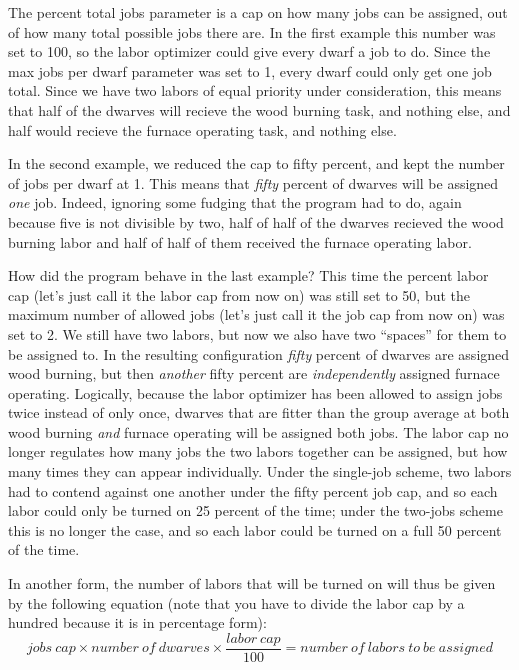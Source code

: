 \documentclass[]{article}
\begin{document}
The percent total jobs parameter is a cap on how many jobs can be assigned, out of how many total
possible jobs there are. In the first example this number was set to 100, so the labor optimizer could
give every dwarf a job to do. Since the max jobs per dwarf parameter was set to 1, every dwarf could only
get one job total. Since we have two labors of equal priority under consideration, this means that half
of the dwarves will recieve the wood burning task, and nothing else, and half would recieve the furnace
operating task, and nothing else.

In the second example, we reduced the cap to fifty percent, and kept the number of jobs per dwarf at 1.
This means that \emph{fifty} percent of dwarves will be assigned \emph{one} job. Indeed, ignoring some
fudging that the program had to do, again because five is not divisible by two, half of half of the
dwarves recieved the wood burning labor and half of half of them received the furnace operating labor.

How did the program behave in the last example? This time the percent labor cap (let's just call it the
labor cap from now on) was still set to 50, but the maximum number of allowed jobs (let's just call it
the job cap from now on) was set to 2. We still have two labors, but now we also have two ``spaces'' for
them to be assigned to. In the resulting configuration \emph{fifty} percent of dwarves are assigned wood
burning, but then \emph{another} fifty percent are \emph{independently} assigned furnace operating.
Logically, because the labor optimizer has been allowed to assign jobs twice instead of only once,
dwarves that are fitter than the group average at both wood burning \emph{and} furnace operating will be
assigned both jobs. The labor cap no longer regulates how many jobs the two labors together can be
assigned, but how many times they can appear individually. Under the single-job scheme, two labors had to
contend against one another under the fifty percent job cap, and so each labor could only be turned on 25
percent of the time; under the two-jobs scheme this is no longer the case, and so each labor could be
turned on a full 50 percent of the time.

In another form, the number of labors that will be turned on will thus be given by the following equation
(note that you have to divide the labor cap by a hundred because it is in percentage form):
\begin{displaymath}
jobs\:cap \times number\:of\:dwarves \times  \frac{labor\:cap}{100} = number\:of\:labors\:to\:be\:assigned
\end{displaymath}
\end{document}
